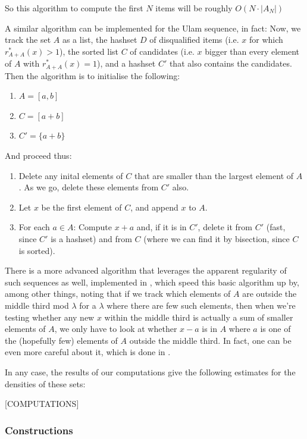 \documentclass{article}
\theoremstyle{definition}
\theoremstyle{remark}
\numberwithin{equation}{section}
\begin{document}
So this algorithm to compute the first $N$ items will be roughly
$O(N \cdot |A_N|)$

A similar algorithm can be implemented for the Ulam sequence, in fact:
Now, we track the set $A$ as a list, the hashset $D$ of disqualified
items (i.e. $x$ for which $r^*_{A+A}(x) > 1$), the sorted list $C$ of
candidates (i.e. $x$ bigger than every element of $A$ with
$r^*_{A+A}(x) = 1$), and a hashset $C'$ that also contains the candidates.  Then the algorithm is to initialise the
following: 

\begin{enumerate}
\item $A = [a,b]$
\item $C = [a+b]$
\item $C' = \{a+b\}$
\end{enumerate}

And proceed thus: 

\begin{enumerate}
\item Delete any inital elements of $C$ that are smaller than the
  largest element of $A$.  As we go, delete these elements from $C'$
  also.
\item Let $x$ be the first element of $C$, and append $x$ to $A$.
\item For each $a \in A$: Compute $x + a$ and, if it is in $C'$,
  delete it from $C'$ (fast, since $C'$ is a hashset) and from $C$
  (where we can find it by bisection, since $C$ is sorted).
\end{enumerate}

There is a more advanced algorithm that leverages the apparent
regularity of such sequences as well, implemented in
\cite{knuth:note}, which speed this basic algorithm up by, among
other things, noting that if we track which elements of $A$ are
outside the middle third mod $\lambda$ for a $\lambda$ where there are
few such elements, then when we're testing whether any new $x$ within
the middle third is actually a sum of smaller elements of $A$, we only
have to look at whether $x - a$ is in $A$ where $a$ is one of the
(hopefully few) elements of $A$ outside the middle third.  In fact,
one can be even more careful about it, which is done in
\cite{knuth:note}.

In any case, the results of our computations give the following
estimates for the densities of these sets: 

{\color{red}[COMPUTATIONS]}

\subsubsection{Constructions}
\end{document}
